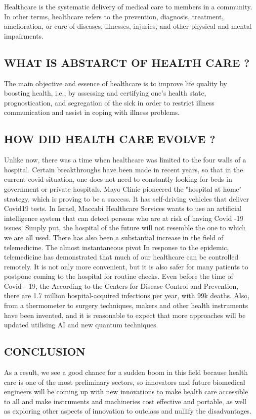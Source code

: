 \documentclass[12pt]{article}
\begin{document}
Healthcare is the systematic delivery of medical care to members in a community. In other terms, healthcare refers to the prevention, diagnosis, treatment, amelioration, or cure of diseases, illnesses, injuries, and other physical and mental impairments.



\subsection{WHAT IS ABSTARCT OF HEALTH CARE ?}

The main objective and essence of healthcare is to improve life quality by boosting health, i.e., by assessing and certifying one's health state, prognostication, and segregation of the sick in order to restrict illness communication and assist in coping with illness problems.

\subsection{HOW DID HEALTH CARE EVOLVE ?}

Unlike now, there was a time when healthcare was limited to the four walls of a hospital. Certain breakthroughs have been made in recent years, so that in the current covid situation, one does not need to constantly looking for beds in government or private hospitals. Mayo Clinic pioneered the "hospital at home" strategy, which is proving to be a success. It has self-driving vehicles that deliver Covid19 tests. In Israel, Maccabi Healthcare Services wants to use an artificial intelligence system that can detect persons who are at risk of having Covid -19 issues. Simply put, the hospital of the future will not resemble the one to which we are all used. There has also been a substantial increase in the field of telemedicine. The almost instantaneous pivot In response to the epidemic, telemedicine has demonstrated that much of our healthcare can be controlled remotely. It is not only more convenient, but it is also safer for many patients to postpone coming to the hospital for routine checks. Even before the time of Covid - 19, the According to the Centers for Disease Control and Prevention, there are 1.7 million hospital-acquired infections per year, with 99k deaths. Also, from a thermometer to surgery techniques, makers and other health instruments have been invented, and it is reasonable to expect that more approaches will be updated utilising AI and new quantum techniques.


\clearpage

\subsection{CONCLUSION}

As a result, we see a good chance for a sudden boom in this field because health care is one of the most preliminary sectors, so innovators and future biomedical engineers will be coming up with new innovations to make health care accessible to all and make instruments and machineries cost effective and portable, as well as exploring other aspects of innovation to outclass and nullify the disadvantages.
\end{document}
